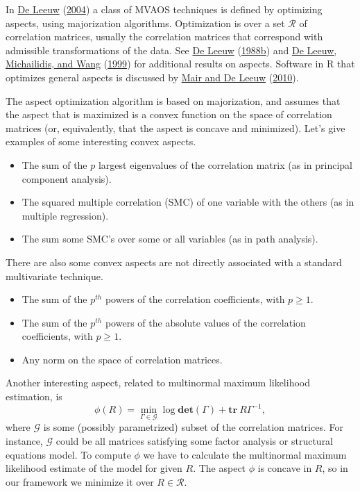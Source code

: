 \documentclass[
  12pt,
]{book}
\providecommand{\tightlist}{%
  \setlength{\itemsep}{0pt}\setlength{\parskip}{0pt}}
\begin{document}
In \protect\hyperlink{ref-deleeuw_C_04a}{De Leeuw} (\protect\hyperlink{ref-deleeuw_C_04a}{2004}) a class of MVAOS techniques is defined by optimizing aspects, using majorization algorithms. Optimization is over a set \(\mathcal{R}\) of correlation matrices, usually the correlation matrices that correspond with admissible transformations of the data. See \protect\hyperlink{ref-deleeuw_A_88a}{De Leeuw} (\protect\hyperlink{ref-deleeuw_A_88a}{1988b}) and \protect\hyperlink{ref-deleeuw_michailidis_wang_C_99}{De Leeuw, Michailidis, and Wang} (\protect\hyperlink{ref-deleeuw_michailidis_wang_C_99}{1999}) for additional results on aspects. Software in R that optimizes general aspects is discussed by \protect\hyperlink{ref-mair_deleeuw_A_10}{Mair and De Leeuw} (\protect\hyperlink{ref-mair_deleeuw_A_10}{2010}).

The aspect optimization algorithm is based on majorization, and assumes that the aspect that is maximized is a convex function on the space of correlation matrices (or, equivalently, that the aspect is concave and minimized). Let's give examples of some interesting convex aspects.

\begin{itemize}
\tightlist
\item
  The sum of the \(p\) largest eigenvalues of the correlation matrix (as in principal component analysis).
\item
  The squared multiple correlation (SMC) of one variable with the others (as in multiple regression).
\item
  The sum some SMC's over some or all variables (as in path analysis).
\end{itemize}

There are also some convex aspects are not directly associated with a standard multivariate technique.

\begin{itemize}
\tightlist
\item
  The sum of the \(p^{th}\) powers of the correlation coefficients, with \(p\geq 1\).
\item
  The sum of the \(p^{th}\) powers of the absolute values of the correlation coefficients, with \(p\geq 1\).
\item
  Any norm on the space of correlation matrices.
\end{itemize}

Another interesting aspect, related to multinormal maximum likelihood estimation, is
\[
\phi(R)=\min_{\Gamma\in\mathcal{G}} \log\mathbf{det}(\Gamma)+\mathbf{tr}\ R\Gamma^{-1},
\]
where \(\mathcal{G}\) is some (possibly parametrized) subset of the correlation matrices. For instance, \(\mathcal{G}\) could be all matrices satisfying some factor analysis or structural equations model. To compute \(\phi\) we have to calculate the multinormal maximum likelihood estimate of the model for given \(R\). The aspect \(\phi\) is concave in \(R\), so in our framework we minimize it over \(R\in\mathcal{R}\).
\end{document}
